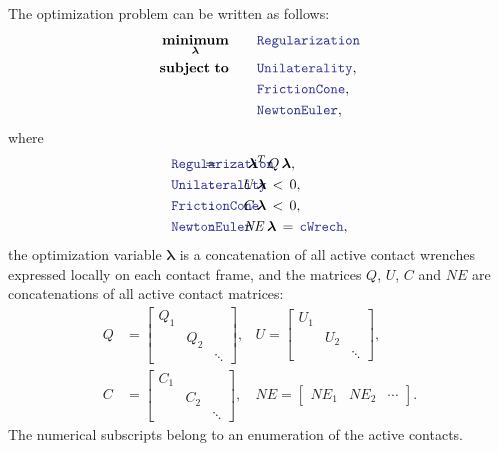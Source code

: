 \documentclass[12pt]{article}
\newcommand{\code}[2][Blue]{\textcolor{#1}{\texttt{#2}}}
\begin{document}
The optimization problem can be written as follows:
%
\begin{align}
    \underset{\bm{\lambda}}{\bm{\mathrm{minimum}}} &\qquad \code{Regularization}\\
    \bm{\mathrm{subject\;to}} &\qquad   \code{Unilaterality},      \nonumber\\
                  &\qquad  \code{FrictionCone},     \nonumber\\
                  & \qquad \code{NewtonEuler}, \nonumber
\end{align}
%
where
%
\begin{align}
    &\code{Regularization}& &\hspace{-20mm}\!\!\!=  \qquad\bm{\lambda}^T \,Q \,\bm{\lambda}, \\
    &\code{Unilaterality}& &\hspace{-20mm}\code{:}\qquad U\,\bm{\lambda} \,<\, 0, \\
    &\code{FrictionCone}& &\hspace{-20mm}\code{:}\qquad C\,\bm{\lambda} \,<\, 0, \\
    &\code{NewtonEuler} & &\hspace{-20mm}\code{:}\qquad \mathit{NE} \,\bm{\lambda} \,=\, \code{cWrech},
\end{align}
%
the optimization variable $\bm{\lambda}$ is a concatenation of all active contact wrenches expressed locally on each contact frame, and the matrices $Q$, $U$, $C$ and $\mathit{NE}$ are concatenations of all active contact matrices:
%
\begin{align}
    Q & = \begin{bmatrix}
        Q_1 & & \\
         & Q_2 & \\
         & & \ddots
    \end{bmatrix}, & U = \begin{bmatrix}
        U_1 & & \\
         & U_2 & \\
         & & \ddots
    \end{bmatrix}, \\
    C & = \begin{bmatrix}
        C_1 & & \\
         & C_2 & \\
         & & \ddots
    \end{bmatrix}, & \mathit{NE} = \begin{bmatrix}
        \mathit{NE}_1 & \mathit{NE}_2 & \cdots
    \end{bmatrix}.
\end{align}
%
The numerical subscripts belong to an enumeration of the active contacts.







\end{document}
